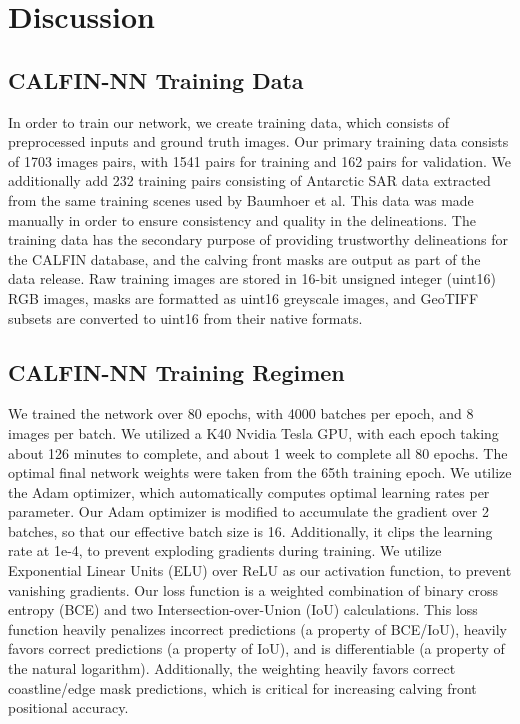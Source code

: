 \documentclass[tc, manuscript]{copernicus}
\begin{document}
\section{Discussion}
\label{sec:discussion}
\subsection{CALFIN-NN Training Data}
\label{sec:training_data}
In order to train our network, we create training data, which consists of preprocessed inputs and ground truth images. Our primary training data consists of 1703 images pairs, with 1541 pairs for training and 162 pairs for validation. We additionally add 232 training pairs consisting of Antarctic SAR data extracted from the same training scenes used by Baumhoer et al. This data was made manually in order to ensure consistency and quality in the delineations. The training data has the secondary purpose of providing trustworthy delineations for the CALFIN database, and the calving front masks are output as part of the data release. Raw training images are stored in 16-bit unsigned integer (uint16) RGB images, masks are formatted as uint16 greyscale images, and GeoTIFF subsets are converted to uint16 from their native formats.

\subsection{CALFIN-NN Training Regimen}
\label{sec:training_regimen}
We trained the network over 80 epochs, with 4000 batches per epoch, and 8 images per batch. We utilized a K40 Nvidia Tesla GPU, with each epoch taking about 126 minutes to complete, and about 1 week to complete all 80 epochs. The optimal final network weights were taken from the 65th training epoch. We utilize the Adam optimizer, which automatically computes optimal learning rates per parameter. Our Adam optimizer is modified to accumulate the gradient over 2 batches, so that our effective batch size is 16. Additionally, it clips the learning rate at 1e-4, to prevent exploding gradients during training.
We utilize Exponential Linear Units (ELU) over ReLU as our activation function, to prevent vanishing gradients. Our loss function is a weighted combination of binary cross entropy (BCE) and two Intersection-over-Union (IoU) calculations. 
This loss function heavily penalizes incorrect predictions (a property of BCE/IoU), heavily favors correct predictions (a property of IoU), and is differentiable (a property of the natural logarithm). Additionally, the weighting heavily favors correct coastline/edge mask predictions, which is critical for increasing calving front positional accuracy.
\end{document}
